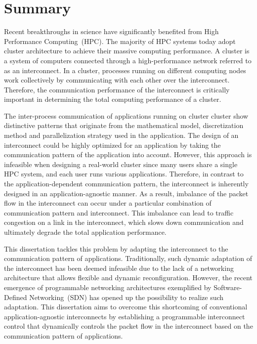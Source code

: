 \chapter*{Summary}

Recent breakthroughs in science have significantly benefited from High
Performance Computing~(HPC). The majority of HPC systems today adopt cluster
architecture to achieve their massive computing performance. A cluster is a
system of computers connected through a high-performance network referred to
as an interconnect. In a cluster, processes running on different computing
nodes work collectively by communicating with each other over the
interconnect. Therefore, the communication performance of the interconnect is
critically important in determining the total computing performance of a
cluster.

The inter-process communication of applications running on cluster cluster
show distinctive patterns that originate from the mathematical model,
discretization method and parallelization strategy used in the application.
The design of an interconnect could be highly optimized for an application by
taking the communication pattern of the application into account. However,
this approach is infeasible when designing a real-world cluster since many
users share a single HPC system, and each user runs various applications.
Therefore, in contrast to the application-dependent communication pattern, the
interconnect is inherently designed in an application-agnostic manner. As a
result, imbalance of the packet flow in the interconnect can occur under a
particular combination of communication pattern and interconnect. This
imbalance can lead to traffic congestion on a link in the interconnect, which
slows down communication and ultimately degrade the total application
performance.

This dissertation tackles this problem by adapting the interconnect to the
communication pattern of applications. Traditionally, such dynamic adaptation
of the interconnect has been deemed infeasible due to the lack of a networking
architecture that allows flexible and dynamic reconfiguration. However, the
recent emergence of programmable networking architectures exemplified by
Software-Defined Networking~(SDN) has opened up the possibility to realize
such adaptation. This dissertation aims to overcome this shortcoming of
conventional application-agnostic interconnects by establishing a programmable
interconnect control that dynamically controls the packet flow in the
interconnect based on the communication pattern of applications.

